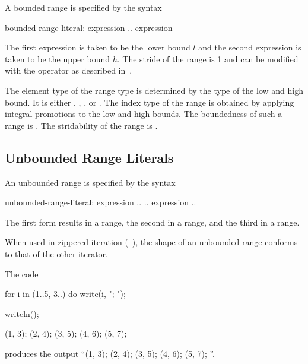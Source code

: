 A bounded range is specified by the syntax
\begin{syntax}
bounded-range-literal:
  expression .. expression
\end{syntax}
The first expression is taken to be the lower bound $l$ and the second
expression is taken to be the upper bound $h$.  The stride of the
range is 1 and can be modified with the  operator as described
in~.

The element type of the range type is determined by the type of the
low and high bound.  It is either , ,
, or .  The index type of the range is obtained by
applying integral promotions to the low and high bounds.  The boundedness
of such a range is .  The stridability of
the range is .

\subsection{Unbounded Range Literals}
\label{Unbounded_Ranges}

An unbounded range is specified by the syntax
\begin{syntax}
unbounded-range-literal:
  expression ..
  .. expression
  ..
\end{syntax}

The first form results in a  range, the
second in a  range, and the third in
a  range.

When used in zippered iteration (~), the shape of an
unbounded range conforms to that of the other iterator.

\begin{example}
The code
\begin{chapelpre}
\end{chapelpre}
\begin{chapel}
for i in (1..5, 3..) do
  write(i, "; ");
\end{chapel}
\begin{chapelpost}
writeln();
\end{chapelpost}
\begin{chapeloutput}
(1, 3); (2, 4); (3, 5); (4, 6); (5, 7); 
\end{chapeloutput}
produces the output ``(1, 3); (2, 4); (3, 5); (4, 6); (5, 7); ''.
\end{example}

